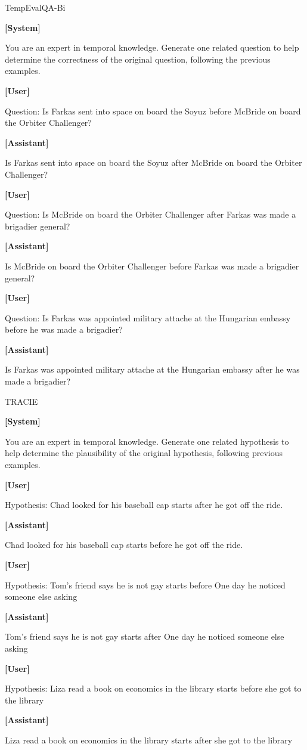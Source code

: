 
\begin{myColorbox}[]{TempEvalQA-Bi}

\textbf{[System]}

You are an expert in temporal knowledge. Generate one related question to help determine the correctness of the original question, following the previous examples.

\textbf{[User]}

Question: Is Farkas sent into space on board the Soyuz before McBride on board the Orbiter Challenger?

\textbf{[Assistant]}

Is Farkas sent into space on board the Soyuz after McBride on board the Orbiter Challenger?

\textbf{[User]}

Question: Is McBride on board the Orbiter Challenger after Farkas was made a brigadier general?

\textbf{[Assistant]}

Is McBride on board the Orbiter Challenger before Farkas was made a brigadier general?

\textbf{[User]}

Question: Is Farkas was appointed military attache at the Hungarian embassy before he was made a brigadier?

\textbf{[Assistant]}

Is Farkas was appointed military attache at the Hungarian embassy after he was made a brigadier?
\end{myColorbox}

\begin{myColorbox}[]{TRACIE}

\textbf{[System]}

You are an expert in temporal knowledge. Generate one related hypothesis to help determine the plausibility of the original hypothesis, following previous examples.

\textbf{[User]}

Hypothesis: Chad looked for his baseball cap starts after he got off the ride.

\textbf{[Assistant]}

Chad looked for his baseball cap starts before he got off the ride.

\textbf{[User]}

Hypothesis: Tom's friend says he is not gay starts before One day he noticed someone else asking

\textbf{[Assistant]}

Tom's friend says he is not gay starts after One day he noticed someone else asking

\textbf{[User]}

Hypothesis: Liza read a book on economics in the library starts before she got to the library

\textbf{[Assistant]}

Liza read a book on economics in the library starts after she got to the library 

\end{myColorbox}



